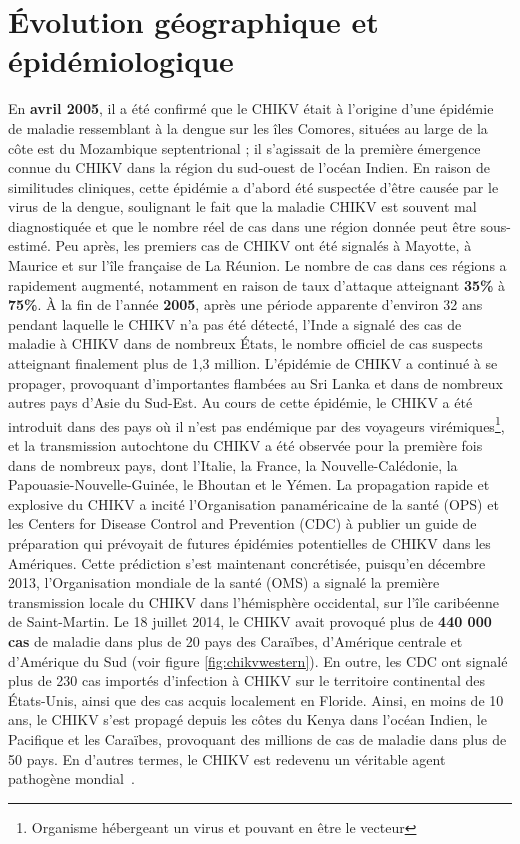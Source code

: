 \section*{Évolution géographique et épidémiologique}
En \textbf{avril 2005}, il a été confirmé que le CHIKV était à l'origine d'une épidémie de maladie ressemblant à la dengue sur les îles Comores, situées au large de la côte est du Mozambique septentrional ; il s'agissait de la première émergence connue du CHIKV dans la région du sud-ouest de l'océan Indien. En raison de similitudes cliniques, cette épidémie a d'abord été suspectée d'être causée par le virus de la dengue, soulignant le fait que la maladie CHIKV est souvent mal diagnostiquée et que le nombre réel de cas dans une région donnée peut être sous-estimé. Peu après, les premiers cas de CHIKV ont été signalés à Mayotte, à Maurice et sur l'île française de La Réunion. Le nombre de cas dans ces régions a rapidement augmenté, notamment en raison de taux d'attaque atteignant \textbf{35\%} à \textbf{75\%}. À la fin de l'année \textbf{2005}, après une période apparente d'environ 32 ans pendant laquelle le CHIKV n'a pas été détecté, l'Inde a signalé des cas de maladie à CHIKV dans de nombreux États, le nombre officiel de cas suspects atteignant finalement plus de 1,3 million. L'épidémie de CHIKV a continué à se propager, provoquant d'importantes flambées au Sri Lanka et dans de nombreux autres pays d'Asie du Sud-Est. Au cours de cette épidémie, le CHIKV a été introduit dans des pays où il n'est pas endémique par des voyageurs virémiques\footnote{ Organisme hébergeant un virus et pouvant en être le vecteur}, et la transmission autochtone du CHIKV a été observée pour la première fois dans de nombreux pays, dont l'Italie, la France, la Nouvelle-Calédonie, la Papouasie-Nouvelle-Guinée, le Bhoutan et le Yémen. La propagation rapide et explosive du CHIKV a incité l'Organisation panaméricaine de la santé (OPS) et les Centers for Disease Control and Prevention (CDC) à publier un guide de préparation qui prévoyait de futures épidémies potentielles de CHIKV dans les Amériques. Cette prédiction s'est maintenant concrétisée, puisqu'en décembre 2013, l'Organisation mondiale de la santé (OMS) a signalé la première transmission locale du CHIKV dans l'hémisphère occidental, sur l'île caribéenne de Saint-Martin. Le 18 juillet 2014, le CHIKV avait provoqué plus de \textbf{440 000 cas} de maladie dans plus de 20 pays des Caraïbes, d'Amérique centrale et d'Amérique du Sud (voir figure \ref{fig:chikvwestern}). En outre, les CDC ont signalé plus de 230 cas importés d'infection à CHIKV sur le territoire continental des États-Unis, ainsi que des cas acquis localement en Floride. Ainsi, en moins de 10 ans, le CHIKV s'est propagé depuis les côtes du Kenya dans l'océan Indien, le Pacifique et les Caraïbes, provoquant des millions de cas de maladie dans plus de 50 pays. En d'autres termes, le CHIKV est redevenu un véritable agent pathogène mondial~\cite{Peyrefitte2007}.
